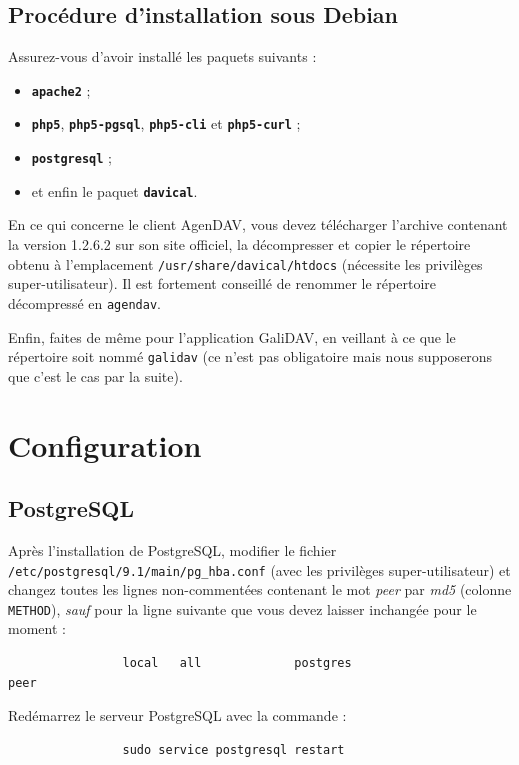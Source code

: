 \documentclass[a4paper, 11pt]{report}
\begin{document}
		\section{Procédure d’installation sous Debian}
			Assurez-vous d’avoir installé les paquets suivants :
			\begin{itemize}
				\item \texttt{\textbf{apache2}} ;
				\item \texttt{\textbf{php5}}, \texttt{\textbf{php5-pgsql}}, \texttt{\textbf{php5-cli}} et \texttt{\textbf{php5-curl}} ;
				\item \texttt{\textbf{postgresql}} ;
				\item et enfin le paquet \texttt{\textbf{davical}}.
			\end{itemize}

			En ce qui concerne le client AgenDAV, vous devez télécharger l’archive contenant la version 1.2.6.2 sur son site officiel, la décompresser et copier le répertoire obtenu à l’emplacement \texttt{/usr/share/davical/htdocs} (nécessite les privilèges super-utilisateur). Il est fortement conseillé de renommer le répertoire décompressé en \texttt{agendav}.

			Enfin, faites de même pour l’application GaliDAV, en veillant à ce que le répertoire soit nommé \texttt{galidav} (ce n’est pas obligatoire mais nous supposerons  que c’est le cas par la suite).
	\chapter{Configuration}
		\section{PostgreSQL}
			Après l’installation de PostgreSQL, modifier le fichier \texttt{/etc/postgresql/9.1/main/pg\_hba.conf} (avec les privilèges super-utilisateur) et changez toutes les lignes non-commentées contenant le mot \textit{peer} par \textit{md5} (colonne \texttt{METHOD}), \emph{sauf} pour la ligne suivante que vous devez laisser inchangée pour le moment :
			\begin{verbatim}
				local   all             postgres                                peer
			\end{verbatim}

			Redémarrez le serveur PostgreSQL avec la commande :
			\begin{verbatim}
				sudo service postgresql restart
			\end{verbatim}
\end{document}
